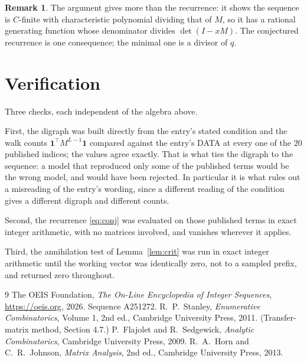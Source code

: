 \documentclass[11pt,a4paper]{article}
\theoremstyle{plain}
\theoremstyle{definition}
\newtheorem{remark}[theorem]{Remark}
\begin{document}
\begin{remark}
The argument gives more than the recurrence: it shows the sequence is $C$-finite with
characteristic polynomial dividing that of $M$, so it has a rational generating function
whose denominator divides $\det(I-xM)$. The conjectured recurrence is one consequence; the
minimal one is a divisor of $q$.
\end{remark}

\section{Verification}

Three checks, each independent of the algebra above.

First, the digraph was built directly from the entry's stated condition and the walk counts
$\mathbf{1}^{\!\top}M^{L-1}\mathbf{1}$ compared against the entry's DATA at
every one of the $20$ published indices; the values agree exactly. That is what ties
the digraph to the sequence: a model that reproduced only some of the published terms would
be the wrong model, and would have been rejected. In particular it is what rules out a
misreading of the entry's wording, since a different reading of the condition gives a
different digraph and different counts.

Second, the recurrence \eqref{eq:conj} was evaluated on those published terms in exact
integer arithmetic, with no matrices involved, and vanishes wherever it applies.

Third, the annihilation test of Lemma~\ref{lem:crit} was run in exact integer arithmetic
until the working vector was identically zero, not to a sampled prefix, and returned zero
throughout.

\begin{thebibliography}{9}
 The OEIS Foundation, \emph{The On-Line Encyclopedia of Integer
Sequences}, \url{https://oeis.org}, 2026. Sequence A251272.
 R.~P.~Stanley, \emph{Enumerative Combinatorics}, Volume 1, 2nd ed.,
Cambridge University Press, 2011. (Transfer-matrix method, Section 4.7.)
 P.~Flajolet and R.~Sedgewick, \emph{Analytic Combinatorics}, Cambridge
University Press, 2009.
 R.~A.~Horn and C.~R.~Johnson, \emph{Matrix Analysis}, 2nd ed., Cambridge
University Press, 2013.
\end{thebibliography}
\end{document}
